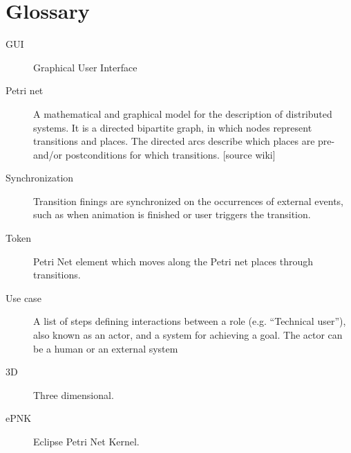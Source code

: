 \section{Glossary}
\begin{description}

\item [GUI] Graphical User Interface

\item [Petri net] A mathematical and graphical model for the description of distributed systems. It is a directed bipartite graph, in which nodes represent transitions and places. The directed arcs describe which places are pre- and/or postconditions for which transitions. [source wiki]

\item [Synchronization] Transition finings are synchronized on the occurrences of external events, such as when animation is finished or user triggers the transition.

\item [Token] Petri Net element which moves along the Petri net places through transitions.

\item [Use case] A list of steps defining interactions between a role (e.g. “Technical user”), also known as an actor, and a system for achieving a goal. The actor can be a human or an external system

\item [3D] Three dimensional.

\item [ePNK] Eclipse Petri Net Kernel.


 \end{description}
